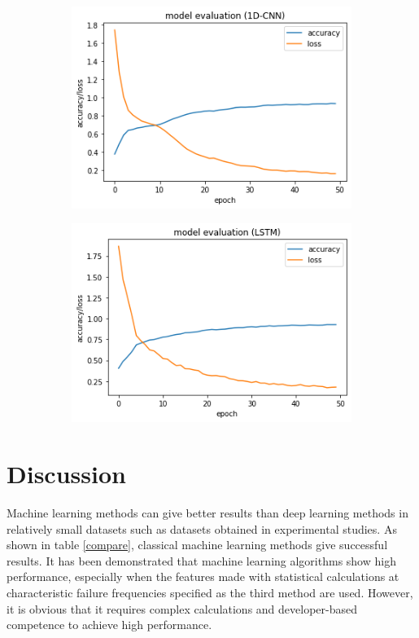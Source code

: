 \begin{figure}[h]
	\begin{subfigure}[b]{.5\linewidth}
		\centering
		\includegraphics[scale=.5]{./fig/cnn_accloss.png}
		\label{tracnn}
	\end{subfigure}
	\begin{subfigure}[b]{.5\linewidth}
		\centering
		\includegraphics[scale=.5]{./fig/lstmaccloss.png}
		\label{tralstm}
	\end{subfigure}
\end{figure}

\section{Discussion}

Machine learning methods can give better results than deep learning methods in relatively small datasets such as datasets obtained in experimental studies. As shown in table \ref{compare}, classical machine learning methods give successful results. It has been demonstrated that machine learning algorithms show high performance, especially when the features made with statistical calculations at characteristic failure frequencies specified as the third method are used. However, it is obvious that it requires complex calculations and developer-based competence to achieve high performance.

